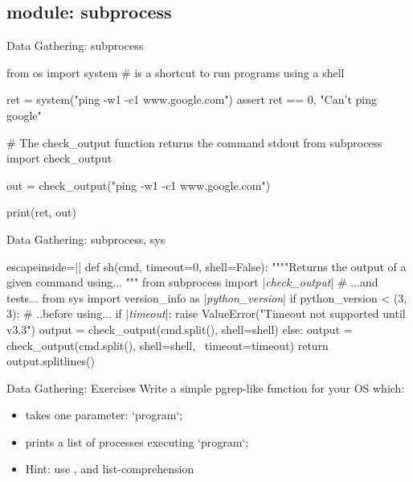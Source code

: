 \subsection{module: subprocess}
\begin{pyframe}{Data Gathering: subprocess}
\begin{pythoncode}
from os import system # is a shortcut to run programs using a shell

ret = system("ping -w1 -c1 www.google.com")
assert ret == 0, "Can't ping google"

# The check_output function returns the command stdout
from subprocess import check_output

out = check_output("ping -w1 -c1 www.google.com")

print(ret, out)
\end{pythoncode}
\end{pyframe}

\begin{pyframe}{Data Gathering: subprocess, sys}
\begin{pythoncode*}{escapeinside=||}
def sh(cmd, timeout=0, shell=False):
    """"Returns the output of a given command using... """
    from subprocess import |\emph{check_output}| # ...and tests...
    from sys import version_info as |\emph{python_version}|
    if python_version < (3, 3): # ..before using...
      if |\emph{timeout}|:
        raise ValueError("Timeout not supported until v3.3")
      output = check_output(cmd.split(), shell=shell)
    else:
      output = check_output(cmd.split(), shell=shell, \
                          timeout=timeout)
    return output.splitlines()
    
    
    
\end{pythoncode*}
\end{pyframe}

\begin{pyframe}{Data Gathering: Exercises}
Write a simple pgrep-like function for your OS which:
\begin{itemize}
\item takes one parameter: `program`;
\item prints a list of processes executing `program`;
\item Hint: use , and list-comprehension
\end{itemize}
\end{pyframe}


